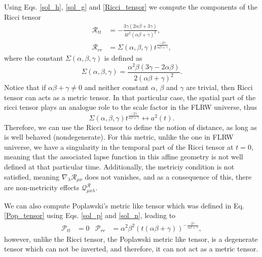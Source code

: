 Using Eqs. \eqref{sol_h}, \eqref{sol_g} and \eqref{Ricci_tensor} we compute the components 
of the Ricci tensor
\begin{align}
    \mathcal{R}_{tt} & = -\frac{3\gamma\left(2\alpha\beta + 3\gamma\right)}{4t^2\left(\alpha\beta + \gamma\right)^2}, \label{R_temporal} \\
    \mathcal{R}_{rr} & = \Sigma\left(\alpha,\beta,\gamma\right)t^{\frac{-2\gamma}{\alpha\beta + \gamma}} \label{R_spatial},
\end{align}
where the constant $\Sigma\left(\alpha,\beta,\gamma\right)$ is defined as
\begin{equation}
    \Sigma\left(\alpha,\beta,\gamma\right) = \frac{\alpha^2\beta\left( 3\gamma - 2\alpha\beta\right)}{2\left(\alpha\beta +\gamma\right)^2}.
\end{equation}
Notice that if $\alpha\beta + \gamma \neq 0$ and neither constant $\alpha$, $\beta$
and $\gamma$ are trivial, then Ricci tensor can acts as a metric tensor. In that 
particular case, the spatial part of the ricci tensor plays an analogue role to 
the scale factor in the FLRW universe, thus
\begin{equation}
    \Sigma\left(\alpha,\beta,\gamma\right)t^{\frac{-2\gamma}{\alpha\beta + \gamma}} \longleftrightarrow a^2(t).
\end{equation}
Therefore, we can use the Ricci tensor to define the notion of distance, as 
long as is well behaved (nondegenerate). For this metric, unlike the one in FLRW 
universe, we have a singularity in the temporal part of the Ricci tensor at $t = 0$, 
meaning that the associated lapse function in this affine geometry is not well 
defined at that particular time. Additionally, the metriciy condition is not satisfied, 
meaning $\nabla_\lambda \mathcal{R}_{\mu\nu}$ does  not vanishes, and as a consequence 
of this, there are non-metricity effects $\mathcal{Q}^{\mathcal{R}}_{\mu\nu\lambda}$.

We can also compute Poplawski's metric like tensor which 
was defined in Eq. \eqref{Pop_tensor} using Eqs. \eqref{sol_p} and \eqref{sol_n}, leading to
\begin{align}
    \mathcal{P}_{tt} & = 0 & \mathcal{P}_{rr} & = \alpha^2\beta^2\left(t\left(\alpha\beta + \gamma\right)\right)^{-\frac{2\gamma}{\alpha\beta + \gamma}},
\end{align}
however, unlike the Ricci tensor, the Poplawski metric like tensor, is a 
degenerate tensor which can not be inverted, and therefore, it can not
act as a metric tensor.

